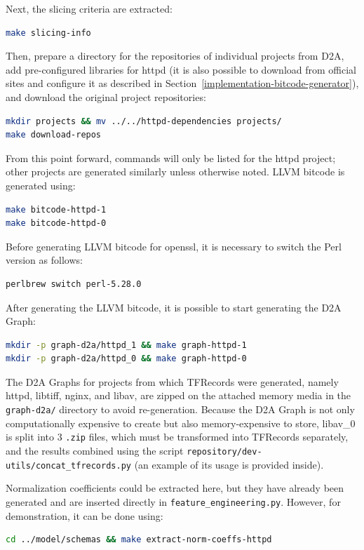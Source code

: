 Next, the slicing criteria are extracted:
\begin{lstlisting}[language=bash, xleftmargin=2em]
make slicing-info
\end{lstlisting}

Then, prepare a directory for the repositories of individual projects from D2A, add pre-configured libraries for httpd (it is also possible to download from official sites and configure it as described in Section~\ref{implementation-bitcode-generator}), and download the original project repositories:
\begin{lstlisting}[language=bash, xleftmargin=2em]
mkdir projects && mv ../../httpd-dependencies projects/
make download-repos
\end{lstlisting}

From this point forward, commands will only be listed for the httpd project; other projects are generated similarly unless otherwise noted. LLVM bitcode is generated using:
\begin{lstlisting}[language=bash, xleftmargin=2em]
make bitcode-httpd-1
make bitcode-httpd-0
\end{lstlisting}

Before generating LLVM bitcode for openssl, it is necessary to switch the Perl version as follows:
\begin{lstlisting}[language=bash, xleftmargin=2em]
perlbrew switch perl-5.28.0
\end{lstlisting}

After generating the LLVM bitcode, it is possible to start generating the D2A Graph:
\begin{lstlisting}[language=bash, xleftmargin=2em]
mkdir -p graph-d2a/httpd_1 && make graph-httpd-1
mkdir -p graph-d2a/httpd_0 && make graph-httpd-0
\end{lstlisting}

The D2A Graphs for projects from which TFRecords were generated, namely httpd, libtiff, nginx, and libav, are zipped on the attached memory media in the \texttt{graph-d2a/} directory to avoid re-generation. Because the D2A Graph is not only computationally expensive to create but also memory-expensive to store, libav\_0 is split into 3 \texttt{.zip} files, which must be transformed into TFRecords separately, and the results combined using the script \texttt{repository/dev-utils/concat\_tfrecords.py} (an example of its usage is provided inside).

Normalization coefficients could be extracted here, but they have already been generated and are inserted directly in \texttt{feature\_engineering.py}. However, for demonstration, it can be done using:
\begin{lstlisting}[language=bash, xleftmargin=2em]
cd ../model/schemas && make extract-norm-coeffs-httpd
\end{lstlisting}

